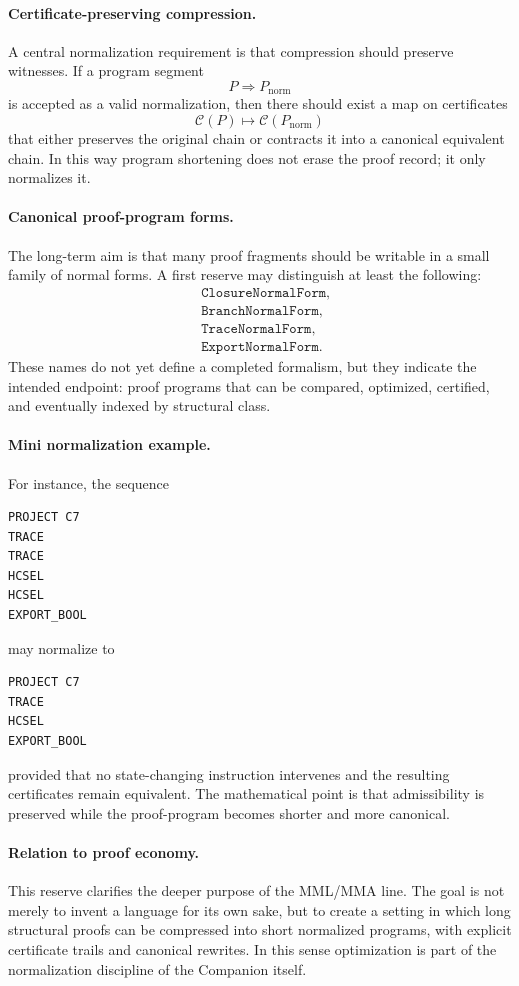 \paragraph{Certificate-preserving compression.}
A central normalization requirement is that compression should preserve witnesses. If a program segment
\[
P \Longrightarrow P_{\mathrm{norm}}
\]
is accepted as a valid normalization, then there should exist a map on certificates
\[
\mathcal C(P) \longmapsto \mathcal C(P_{\mathrm{norm}})
\]
that either preserves the original chain or contracts it into a canonical equivalent chain. In this way program shortening does not erase the proof record; it only normalizes it.

\paragraph{Canonical proof-program forms.}
The long-term aim is that many proof fragments should be writable in a small family of normal forms. A first reserve may distinguish at least the following:
\begin{align*}
&\texttt{ClosureNormalForm},\\
&\texttt{BranchNormalForm},\\
&\texttt{TraceNormalForm},\\
&\texttt{ExportNormalForm}.
\end{align*}
These names do not yet define a completed formalism, but they indicate the intended endpoint: proof programs that can be compared, optimized, certified, and eventually indexed by structural class.

\paragraph{Mini normalization example.}
For instance, the sequence
\begin{verbatim}
PROJECT C7
TRACE
TRACE
HCSEL
HCSEL
EXPORT_BOOL
\end{verbatim}
may normalize to
\begin{verbatim}
PROJECT C7
TRACE
HCSEL
EXPORT_BOOL
\end{verbatim}
provided that no state-changing instruction intervenes and the resulting certificates remain equivalent. The mathematical point is that admissibility is preserved while the proof-program becomes shorter and more canonical.

\paragraph{Relation to proof economy.}
This reserve clarifies the deeper purpose of the MML/MMA line. The goal is not merely to invent a language for its own sake, but to create a setting in which long structural proofs can be compressed into short normalized programs, with explicit certificate trails and canonical rewrites. In this sense optimization is part of the normalization discipline of the Companion itself.

